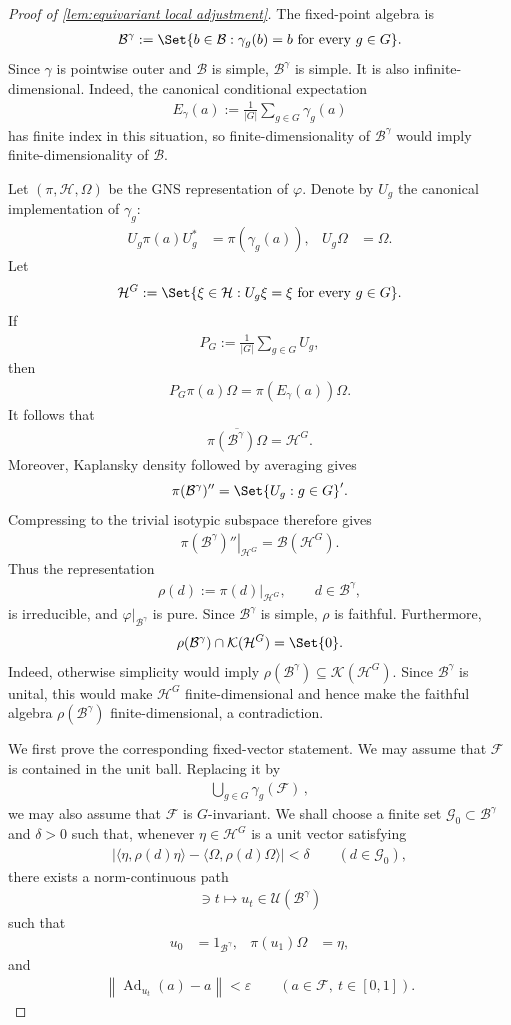 \documentclass[a4paper,10pt]{article}
\numberwithin{equation}{section}
\theoremstyle{plain}
\theoremstyle{plain}
\theoremstyle{plain}
\theoremstyle{plain}
\theoremstyle{plain}
\theoremstyle{remark}
\theoremstyle{definition}
\newcommand{\calB}{\mathcal{B}}
\newcommand{\calF}{\mathcal{F}}
\newcommand{\calG}{\mathcal{G}}
\newcommand{\calU}{\mathcal{U}}
\newcommand{\calH}{\mathcal{H}}
\newcommand{\Compacts}[1]{\mathcal{K}(#1)}
\newcommand\norm[1]{\left\lVert#1\right\rVert}
\newcommand{\ip}[2]{\langle #1, #2 \rangle}
\newcommand{\Ad}[1]{\operatorname{Ad}_{#1}}
\newcommand{\eq}[1]{\begin{align*}#1\end{align*}}
\newcommand{\eql}[1]{\begin{align}#1\end{align}}
\begin{document}
\begin{proof}[Proof of \cref{lem:equivariant local adjustment}]
The fixed-point algebra is
\eq{
    \calB^\gamma
    :=
    \Set{
        b\in\calB:
        \gamma_g(b)=b
        \text{ for every }g\in G
    }.
}
Since \(\gamma\) is pointwise outer and \(\calB\) is simple,
\(\calB^\gamma\) is simple. It is also infinite-dimensional. Indeed,
the canonical conditional expectation
\eq{
    E_\gamma(a)
    :=
    \frac{1}{|G|}
    \sum_{g\in G}
    \gamma_g(a)
}
has finite index in this situation, so finite-dimensionality of
\(\calB^\gamma\) would imply finite-dimensionality of \(\calB\).

Let \((\pi,\calH,\Omega)\) be the GNS representation of \(\varphi\).
Denote by \(U_g\) the canonical implementation of \(\gamma_g\):
\eq{
    U_g\pi(a)U_g^*
    &=
    \pi(\gamma_g(a)),&
    U_g\Omega
    &=
    \Omega.
}
Let
\eq{
    \calH^G
    :=
    \Set{
        \xi\in\calH:
        U_g\xi=\xi
        \text{ for every }g\in G
    }.
}
If
\eq{
    P_G
    :=
    \frac{1}{|G|}
    \sum_{g\in G}U_g,
}
then
\eq{
    P_G\pi(a)\Omega
    =
    \pi(E_\gamma(a))\Omega.
}
It follows that
\eq{
    \overline{\pi(\calB^\gamma)\Omega}
    =
    \calH^G.
}
Moreover, Kaplansky density followed by averaging gives
\eq{
    \pi(\calB^\gamma)''
    =
    \Set{
        U_g:g\in G
    }'.
}
Compressing to the trivial isotypic subspace therefore gives
\eq{
    \left.
    \pi(\calB^\gamma)''
    \right|_{\calH^G}
    =
    \calB(\calH^G).
}
Thus the representation
\eq{
    \rho(d)
    :=
    \left.\pi(d)\right|_{\calH^G},
    \qquad
    d\in\calB^\gamma,
}
is irreducible, and \(\varphi|_{\calB^\gamma}\) is pure. Since
\(\calB^\gamma\) is simple, \(\rho\) is faithful. Furthermore,
\eq{
    \rho(\calB^\gamma)
    \cap
    \Compacts{\calH^G}
    =
    \Set{0}.
}
Indeed, otherwise simplicity would imply
\(\rho(\calB^\gamma)\subseteq\Compacts{\calH^G}\). Since
\(\calB^\gamma\) is unital, this would make \(\calH^G\)
finite-dimensional and hence make the faithful algebra
\(\rho(\calB^\gamma)\) finite-dimensional, a contradiction.

We first prove the corresponding fixed-vector statement. We may
assume that \(\calF\) is contained in the unit ball. Replacing it by
\eq{
    \bigcup_{g\in G}
    \gamma_g(\calF)\, ,
}
we may also assume that \(\calF\) is \(G\)-invariant. We shall choose a
finite set \(\calG_0\subset\calB^\gamma\) and \(\delta>0\) such that,
whenever \(\eta\in\calH^G\) is a unit vector satisfying
\eq{
    \left|
        \ip{\eta}{\rho(d)\eta}
        -
        \ip{\Omega}{\rho(d)\Omega}
    \right|
    <
    \delta
    \qquad
    (d\in\calG_0),
}
there exists a norm-continuous path
\eq{
    [0,1]\ni t
    \longmapsto
    u_t\in\calU(\calB^\gamma)
}
such that
\eq{
    u_0
    &=
    1_{\calB^\gamma},&
    \pi(u_1)\Omega
    &=
    \eta,
}
and
\eql{\label{eq:fixed sector local adjustment}
    \norm{
        \Ad{u_t}(a)-a
    }
    <
    \varepsilon
    \qquad
    (a\in\calF,\ t\in[0,1]).
}


\end{proof}
\end{document}
